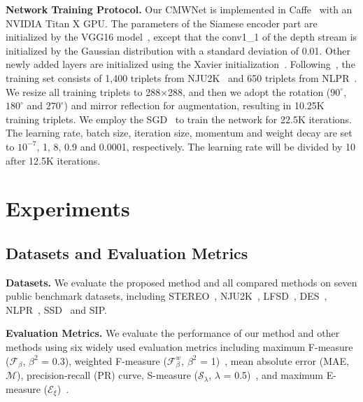 \documentclass[runningheads]{llncs}
\begin{document}
\noindent\textbf{Network Training Protocol.}
Our CMWNet is implemented in Caffe~\cite{2014Caffe}
with an NVIDIA Titan X GPU.
The parameters of the Siamese encoder part are initialized by
the VGG16 model~\cite{2014VGG16ICLR}, except that the conv1\_1
of the depth stream is initialized by the Gaussian distribution with
a standard deviation of 0.01.
Other newly added layers are initialized using the
Xavier initialization~\cite{2010Xavier}.
Following~\cite{Han2018CTMF,Fan2019D3Net}, the training set
consists of 1,400 triplets from NJU2K~\cite{Ju2014NJU2K}
and 650 triplets from NLPR~\cite{Peng2014NLPR}.
We resize all training triplets to 288$\times$288, and then
we adopt the rotation ($90^{\circ}$, $180^{\circ}$ and $270^{\circ}$)
and mirror reflection for augmentation, resulting in 10.25K training triplets.
We employ the SGD~\cite{2010SGD} to train the network for 22.5K
iterations.
The learning rate, batch size, iteration size, momentum and
weight decay are set to $10^{-7}$, 1, 8, 0.9 and 0.0001, respectively.
The learning rate will be divided by 10 after 12.5K iterations.





\section{Experiments}

\subsection{Datasets and Evaluation Metrics}
\noindent\textbf{Datasets.}
We evaluate the proposed method and all compared methods on seven public benchmark datasets,
including STEREO~\cite{Niu2012STEREO}, NJU2K~\cite{Ju2014NJU2K},
LFSD~\cite{Li2014LFSD}, DES~\cite{Cheng2014DES},
NLPR~\cite{Peng2014NLPR}, SSD~\cite{SSD2017}
and SIP\cite{Fan2019D3Net}.






\noindent\textbf{Evaluation Metrics.}
We evaluate the performance of our method and other methods using
six widely used evaluation metrics including
maximum F-measure ($\mathcal{F}_{\beta}$, $\beta^2$ = 0.3),
weighted F-measure ($\mathcal{F}_{\beta}^w$, $\beta^2$ = 1)~\cite{2014WeiFm},
mean absolute error (MAE, $\mathcal{M}$),
precision-recall (PR) curve,
S-measure ($\mathcal{S}_{\lambda}$, $\lambda$ = 0.5)~\cite{Fan2017Smeasure},
and maximum E-measure ($\mathcal{E}_{\xi}$)~\cite{Fan2018Emeasure}.
\end{document}
